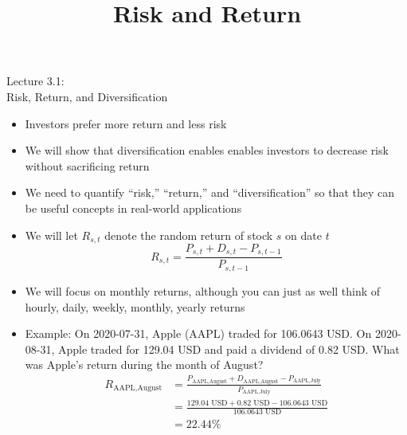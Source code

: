\documentclass{beamer}
\title{Risk and Return}
\begin{document}
\begin{frame}
\begin{center}
\Huge Lecture 3.1: \\
Risk, Return, and Diversification
\end{center}
\end{frame}

\begin{frame}{}
	\begin{itemize}
		\item Investors prefer more return and less risk
		\item We will show that diversification enables enables investors to decrease risk without sacrificing return
		\item We need to quantify ``risk,'' ``return,'' and ``diversification'' so that they can be useful concepts in real-world applications
	\end{itemize}
\end{frame}

\begin{frame}{}
	\begin{itemize}
		\item We will let $R_{s,t}$ denote the random return of stock $s$ on date $t$
			\begin{equation*}
				R_{s,t}=\frac{P_{s,t}+D_{s,t}-P_{s,t-1}}{P_{s,t-1}}
			\end{equation*}
		\item We will focus on monthly returns, although you can just as well think of hourly, daily, weekly, monthly, yearly returns 
		\item Example: On 2020-07-31, Apple (AAPL) traded for 106.0643 USD. On 2020-08-31, Apple traded for 129.04 USD and paid a dividend of 0.82 USD. What was Apple's return during the month of August?
	\pause
	{\color{blue}
		\scriptsize
		\begin{align}
			R_{\text{AAPL},\text{August}}&=\frac{P_{\text{AAPL},\text{August}}+D_{\text{AAPL},\text{August}}-P_{\text{AAPL},\text{July}}}{P_{\text{AAPL},\text{July}}}\\
			&=\frac{129.04\text{ USD}+0.82\text{ USD}-106.0643\text{ USD}}{106.0643\text{ USD}}\\
			&=22.44\%
		\end{align}
	}
	\end{itemize}
\end{frame}
\end{document}
